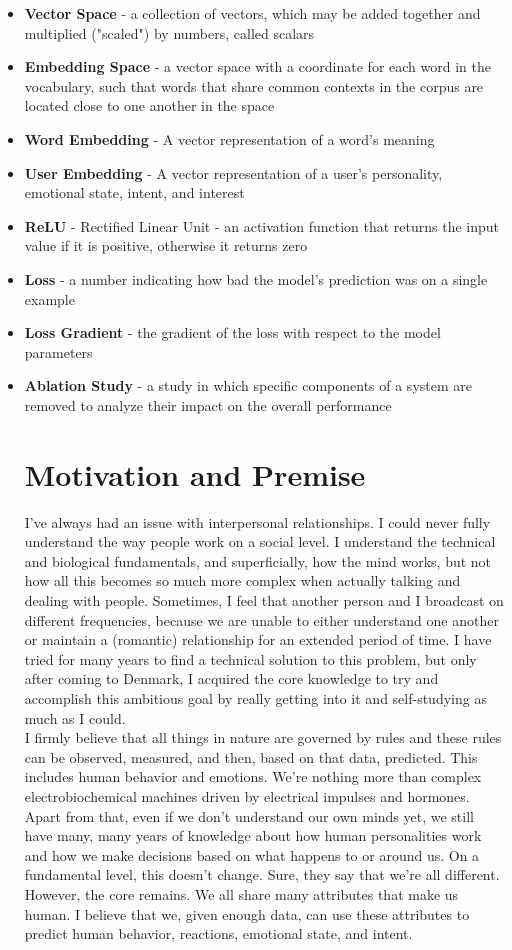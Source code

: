 \documentclass{article}
\begin{document}
\begin{itemize}
	\item \textbf{Vector Space} - a collection of vectors, which may be added together and multiplied ("scaled") by numbers, called scalars
	\item \textbf{Embedding Space} - a vector space with a coordinate for each word in the vocabulary, such that words that share common contexts in the corpus are located close to one another in the space
	\item \textbf{Word Embedding} - A vector representation of a word's meaning
	\item \textbf{User Embedding} - A vector representation of a user's personality, emotional state, intent, and interest
	\item \textbf{ReLU} - Rectified Linear Unit - an activation function that returns the input value if it is positive, otherwise it returns zero
	\item \textbf{Loss} - a number indicating how bad the model's prediction was on a single example
	\item \textbf{Loss Gradient} - the gradient of the loss with respect to the model parameters
	\item \textbf{Ablation Study} - a study in which specific components of a system are removed to analyze their impact on the overall performance
	
\section{Motivation and Premise}
I've always had an issue with interpersonal relationships. I could never fully understand the way people work on a social level. I understand the technical and biological fundamentals, and superficially, how the mind works, but not how all this becomes so much more complex when actually talking and dealing with people. Sometimes, I feel that another person and I broadcast on different frequencies, because we are unable to either understand one another or maintain a (romantic) relationship for an extended period of time. I have tried for many years to find a technical solution to this problem, but only after coming to Denmark, I acquired the core knowledge to try and accomplish this ambitious goal by really getting into it and self-studying as much as I could.\\
I firmly believe that all things in nature are governed by rules and these rules can be observed, measured, and then, based on that data, predicted. This includes human behavior and emotions. We’re nothing more than complex electrobiochemical machines driven by electrical impulses and hormones. Apart from that, even if we don’t understand our own minds yet, we still have many, many years of knowledge about how human personalities work and how we make decisions based on what happens to or around us. On a fundamental level, this doesn’t change. Sure, they say that we’re all different. However, the core remains. We all share many attributes that make us human. I believe that we, given enough data, can use these attributes to predict human behavior, reactions, emotional state, and intent.


\end{itemize}
\end{document}
